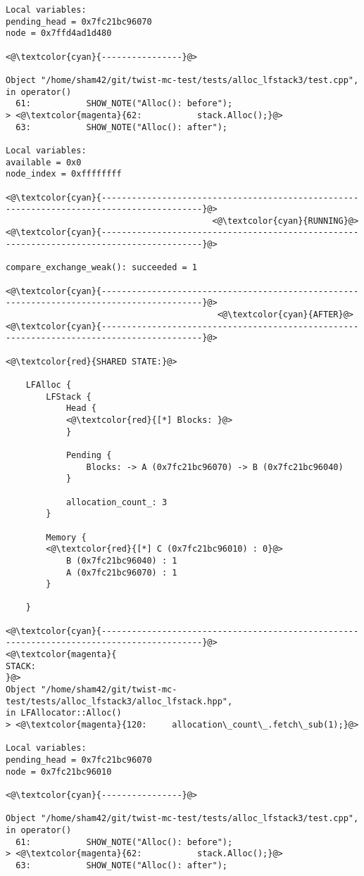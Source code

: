\begin{adjustwidth}{-3.3cm}{-1cm}
\begin{allintypewriter}
\begin{multicols*}{2}
\begin{lstlisting}[numbers=none]
Local variables: 
pending_head = 0x7fc21bc96070
node = 0x7ffd4ad1d480

<@\textcolor{cyan}{----------------}@>

Object "/home/sham42/git/twist-mc-test/tests/alloc_lfstack3/test.cpp",
in operator()
  61:           SHOW_NOTE("Alloc(): before");
> <@\textcolor{magenta}{62:           stack.Alloc();}@>
  63:           SHOW_NOTE("Alloc(): after");

Local variables: 
available = 0x0
node_index = 0xffffffff

<@\textcolor{cyan}{------------------------------------------------------------------------------------------}@>
                                         <@\textcolor{cyan}{RUNNING}@>
<@\textcolor{cyan}{------------------------------------------------------------------------------------------}@>

compare_exchange_weak(): succeeded = 1

<@\textcolor{cyan}{------------------------------------------------------------------------------------------}@>
                                          <@\textcolor{cyan}{AFTER}@>
<@\textcolor{cyan}{------------------------------------------------------------------------------------------}@>

<@\textcolor{red}{SHARED STATE:}@>

    LFAlloc {
	    LFStack {
		    Head {
			<@\textcolor{red}{[*] Blocks: }@>
		    }

		    Pending {
			    Blocks: -> A (0x7fc21bc96070) -> B (0x7fc21bc96040) 
		    }

		    allocation_count_: 3
	    }

	    Memory {
		<@\textcolor{red}{[*] C (0x7fc21bc96010) : 0}@>
		    B (0x7fc21bc96040) : 1
		    A (0x7fc21bc96070) : 1
	    }

    }

<@\textcolor{cyan}{------------------------------------------------------------------------------------------}@>
<@\textcolor{magenta}{
STACK:
}@>
Object "/home/sham42/git/twist-mc-test/tests/alloc_lfstack3/alloc_lfstack.hpp",
in LFAllocator::Alloc()
> <@\textcolor{magenta}{120:     allocation\_count\_.fetch\_sub(1);}@>

Local variables: 
pending_head = 0x7fc21bc96070
node = 0x7fc21bc96010

<@\textcolor{cyan}{----------------}@>

Object "/home/sham42/git/twist-mc-test/tests/alloc_lfstack3/test.cpp",
in operator()
  61:           SHOW_NOTE("Alloc(): before");
> <@\textcolor{magenta}{62:           stack.Alloc();}@>
  63:           SHOW_NOTE("Alloc(): after");


\end{lstlisting}
\end{multicols*}
\end{allintypewriter}
\end{adjustwidth}
